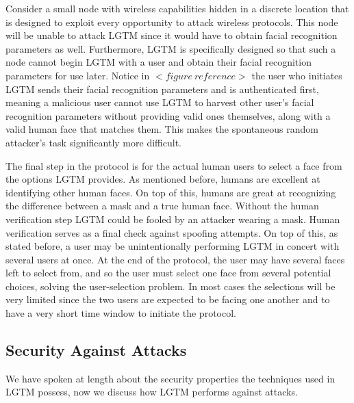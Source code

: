 \documentclass[12pt]{report}
\begin{document}
Consider a small node with wireless capabilities hidden in a discrete location that is designed to exploit every opportunity to attack wireless protocols. This node will be unable to attack LGTM since it would have to obtain facial recognition parameters as well. Furthermore, LGTM is specifically designed so that such a node cannot begin LGTM with a user and obtain their facial recognition parameters for use later. Notice in $<figure \: reference>$ the user who initiates LGTM sends their facial recognition parameters and is authenticated first, meaning a malicious user cannot use LGTM to harvest other user's facial recognition parameters without providing valid ones themselves, along with a valid human face that matches them. This makes the spontaneous random attacker's task significantly more difficult. \par


The final step in the protocol is for the actual human users to select a face from the options LGTM provides. As mentioned before, humans are excellent at identifying other human faces. On top of this, humans are great at recognizing the difference between a mask and a true human face. Without the human verification step LGTM could be fooled by an attacker wearing a mask. Human verification serves as a final check against spoofing attempts. On top of this, as stated before, a user may be unintentionally performing LGTM in concert with several users at once. At the end of the protocol, the user may have several faces left to select from, and so the user must select one face from several potential choices, solving the user-selection problem. In most cases the selections will be very limited since the two users are expected to be facing one another and to have a very short time window to initiate the protocol. \par


\subsection{Security Against Attacks}
We have spoken at length about the security properties the techniques used in LGTM possess, now we discuss how LGTM performs against attacks. \par
\end{document}

